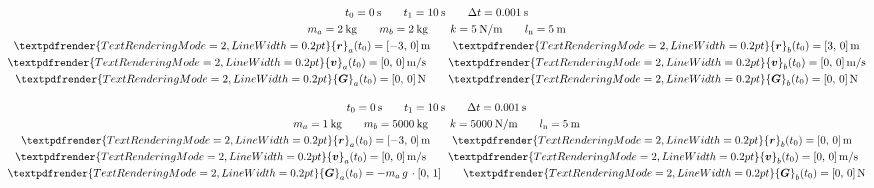 \documentclass[a4paper,12pt,%
onecolumn,oneside,%
british%
]{memoir}
\renewcommand*{\bm}[1]{\textpdfrender{TextRenderingMode=2,LineWidth=0.2pt}{\boldsymbol{#1}}}
\newcommand*{\incr}{\Delta}%
\renewcommand*{\|}[1][]{\nonscript\:#1\vert\nonscript\:\mathopen{}}
\newcommand*{\yr}{\bm{r}}
\newcommand*{\yra}{\yr_{a}}
\newcommand*{\yrb}{\yr_{b}}
\newcommand*{\yv}{\bm{v}}
\newcommand*{\yva}{\yv_{a}}
\newcommand*{\yvb}{\yv_{b}}
\newcommand*{\ylo}{l_{\textrm{n}}}
\newcommand*{\yti}{t_{0}}
\newcommand*{\ytf}{t_{1}}
\newcommand*{\Dt}{\incr t}
\newcommand*{\ym}{m}%
\newcommand*{\yma}{\ym_{a}}
\newcommand*{\ymb}{\ym_{b}}
\newcommand*{\yG}{\bm{G}}
\newcommand*{\yGa}{\yG_{a}}
\newcommand*{\yGb}{\yG_{b}}
\begin{document}
\begin{exercise}[label={ex:nonhooke}]
\begin{description}[itemsep=\baselineskip]
  \item[Set 2:]
        \begin{equation*}
      \begin{gathered}
        \yti=\qty{0}{s}
        \qquad
        \ytf=\qty{10}{s}
        \qquad
        \Dt = \qty{0.001}{s}
        \\
        \yma=\qty{2}{kg}
        \qquad
        \ymb=\qty{2}{kg}
        \qquad
        k=\qty{5}{N/m}
        \qquad
        \ylo = \qty{5}{m}
        \\
        \yra(\yti)=[\num{-3},\, \num{0}]\,\unit{m}
        \qquad
        \yrb(\yti)=[\num{3},\, \num{0}]\,\unit{m}
        \\
        \yva(\yti)=[\num{0},\, \num{0}]\,\unit{m/s}
        \qquad
        \yvb(\yti)=[\num{0},\, \num{0}]\,\unit{m/s}
        \\
        \yGa(\yti)= [\num{0},\, \num{0}]\,\unit{N}
        \qquad
        \yGb(\yti)=[\num{0},\, \num{0}]\,\unit{N}
      \end{gathered}
    \end{equation*}

  \item[Set 3:]
        \begin{equation*}
      \begin{gathered}
        \yti=\qty{0}{s}
        \qquad
        \ytf=\qty{10}{s}
        \qquad
        \Dt = \qty{0.001}{s}
        \\
        \yma=\qty{1}{kg}
        \qquad
        \ymb=\qty{5000}{kg}
        \qquad
        k=\qty{5000}{N/m}
        \qquad
        \ylo = \qty{5}{m}
        \\
        \yra(\yti)=[\num{-3},\, \num{0}]\,\unit{m}
        \qquad
        \yrb(\yti)=[\num{0},\, \num{0}]\,\unit{m}
        \\
        \yva(\yti)=[\num{0},\, \num{0}]\,\unit{m/s}
        \qquad
        \yvb(\yti)=[\num{0},\, \num{0}]\,\unit{m/s}
        \\
        \yGa(\yti)= -\yma\,g\,\cdot[0,\, 1]
        \qquad
        \yGb(\yti)=[\num{0},\, \num{0}]\,\unit{N}
      \end{gathered}
    \end{equation*}


\end{description}
\end{exercise}
\end{document}
